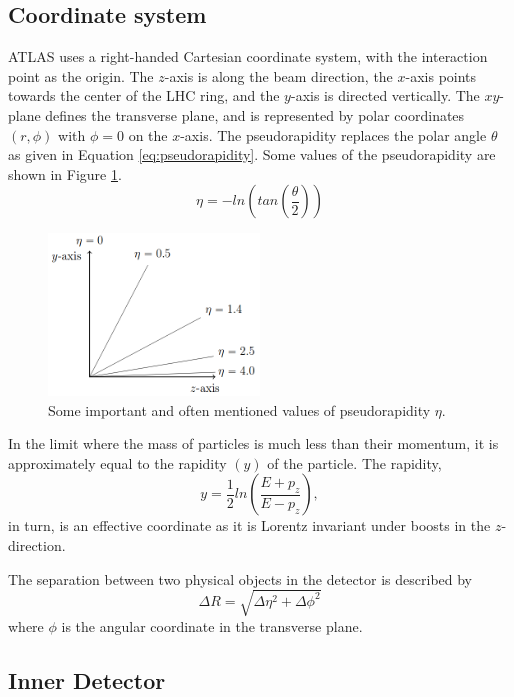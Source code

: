 \documentclass[11pt,a4paper,openright,twoside]{report}
\begin{document}
\subsection{Coordinate system}
ATLAS uses a right-handed Cartesian coordinate system, with the interaction point as the origin. The $z$-axis is along the beam direction, the $x$-axis points towards the center of the LHC ring, and the $y$-axis is directed vertically. The $xy$-plane defines the transverse plane, and is represented by polar coordinates $(r,\phi)$ with $\phi=0$ on the $x$-axis. The pseudorapidity replaces the polar angle $\theta$ as given in Equation \ref{eq:pseudorapidity}. Some values of the pseudorapidity are shown in Figure \ref{fig:eta}.
\begin{equation}
\eta = -ln\left(tan\left(\frac{\theta}{2}\right)\right)
\label{eq:pseudorapidity}
\end{equation}

\begin{figure}[h]
\centering
\includegraphics[width=0.5\textwidth]{prapidity.png}
\caption{Some important and often mentioned values of pseudorapidity $\eta$.}
\label{fig:eta}
\end{figure}

In the limit where the mass of particles is much less than their momentum, it is approximately equal to the rapidity $(y)$ of the particle. The rapidity,
\begin{equation}
y = \frac{1}{2} ln\left(\frac{E+p_z}{E-p_z}\right),
\end{equation}
in turn, is an effective coordinate as it is Lorentz invariant under boosts in the $z$-direction.

The separation between two physical objects in the detector is described by 
\begin{equation}
\Delta R = \sqrt{\Delta\eta^2 + \Delta\phi^2}
\end{equation}
where $\phi$ is the angular coordinate in the transverse plane.

\subsection{Inner Detector}
\end{document}
